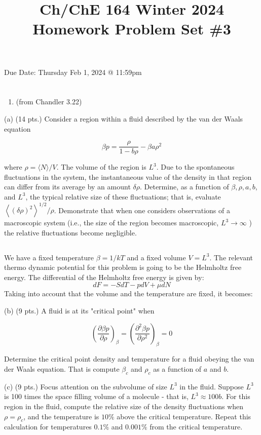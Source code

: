 \documentclass[10pt]{article}
\title{Ch/ChE 164 Winter 2024 
 Homework Problem Set \#3 }
\author{}
\date{}
\begin{document}
\maketitle
Due Date: Thursday Feb 1, 2024 @ 11:59pm
\section{}
\begin{enumerate}
  \item (from Chandler 3.22)
\end{enumerate}

(a) (14 pts.) Consider a region within a fluid described by the van der Waals equation

$$
\beta p=\frac{\rho}{1-b \rho}-\beta a \rho^{2}
$$

where $\rho=\langle N\rangle / V$. The volume of the region is $L^{3}$. Due to the spontaneous fluctuations in the system, the instantaneous value of the density in that region can differ from its average by an amount $\delta \rho$. Determine, as a function of $\beta, \rho, a, b$, and $L^{3}$, the typical relative size of these fluctuations; that is, evaluate $\left\langle(\delta \rho)^{2}\right\rangle^{1 / 2} / \rho$. Demonstrate that when one considers observations of a macroscopic system (i.e., the size of the region becomes macroscopic, $L^{3} \rightarrow \infty$ ) the relative fluctuations become negligible.
\subsection{}
We have a fixed temperature $\beta = 1/kT$ and a fixed volume $V=L^3$. The relevant thermo dynamic potential for this problem is going to be the Helmholtz free energy. The differential of the Helmholtz free energy is given by:
\begin{equation}
  dF=-SdT-pdV+\mu dN
\end{equation}
Taking into account that the volume and the temperature are fixed, it becomes:

(b) (9 pts.) A fluid is at its "critical point" when

$$
\left(\frac{\partial \beta p}{\partial \rho}\right)_{\beta}=\left(\frac{\partial^{2} \beta p}{\partial \rho^{2}}\right)_{\beta}=0
$$

Determine the critical point density and temperature for a fluid obeying the van der Waals equation. That is compute $\beta_{c}$ and $\rho_{c}$ as a function of $a$ and $b$.

(c) (9 pts.) Focus attention on the subvolume of size $L^{3}$ in the fluid. Suppose $L^{3}$ is 100 times the space filling volume of a molecule - that is, $L^{3} \approx 100 b$. For this region in the fluid, compute the relative size of the density fluctuations when $\rho=\rho_{c}$, and the temperature is $10 \%$ above the critical temperature. Repeat this calculation for temperatures $0.1 \%$ and $0.001 \%$ from the critical temperature.
\end{document}
